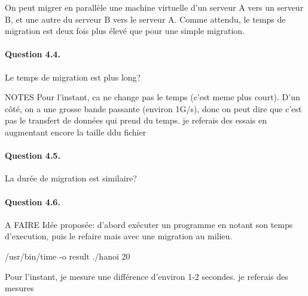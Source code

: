 \documentclass[12pt]{article}
\begin{document}
On peut migrer en parallèle une machine virtuelle d'un serveur A vers un serveur B, et une autre du serveur B vers le serveur A. Comme attendu, le temps de migration est deux fois plus élevé que pour une simple migration.

\paragraph{Question 4.4.}

Le temps de migration est plus long?


NOTES
Pour l'instant, ca ne change pas le temps (c'est meme plus court). D'un côté, on a une grosse bande passante (environ 1G/s), donc on peut dire que c'est pas le transfert de données qui prend du temps. je referais des essais en augmentant encore la taille ddu fichier

\paragraph{Question 4.5.}

La durée de migration est similaire?

\paragraph{Question 4.6.}

A FAIRE
Idée proposée: d'abord exécuter un programme en notant son temps d'execution, puis le refaire mais avec une migration au milieu.

/usr/bin/time -o result ./hanoi 20

Pour l'instant, je mesure une différence d'environ 1-2 secondes. je referais des mesures
\end{document}
